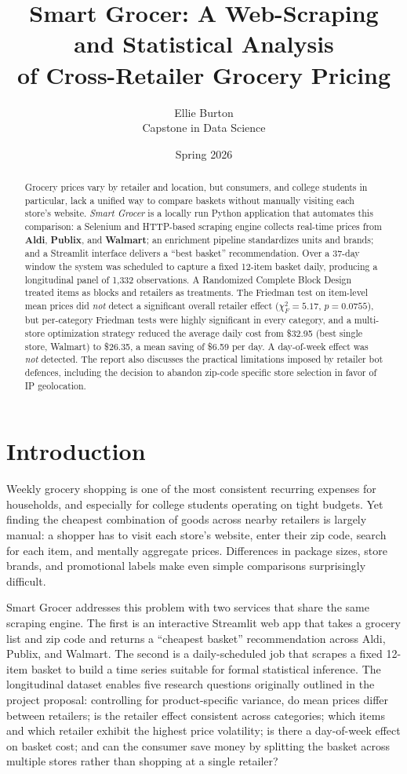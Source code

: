 \documentclass[11pt]{article}
\title{\textbf{Smart Grocer:} A Web-Scraping and Statistical Analysis\\
of Cross-Retailer Grocery Pricing}
\author{Ellie Burton \\ Capstone in Data Science}
\date{Spring 2026}
\begin{document}
\maketitle

\begin{abstract}
\noindent
Grocery prices vary by retailer and location, but consumers, and college
students in particular, lack a unified way to compare baskets without
manually visiting each store's website. \textit{Smart Grocer} is a
locally run Python application that automates this comparison: a
Selenium and HTTP-based scraping engine collects real-time prices from
\textbf{Aldi}, \textbf{Publix}, and \textbf{Walmart}; an enrichment
pipeline standardizes units and brands; and a Streamlit interface
delivers a ``best basket'' recommendation. Over a 37-day window the
system was scheduled to capture a fixed 12-item basket daily, producing
a longitudinal panel of 1{,}332 observations. A Randomized Complete
Block Design treated items as blocks and retailers as treatments. The
Friedman test on item-level mean prices did \textit{not} detect a
significant overall retailer effect ($\chi^2_F = 5.17$, $p = 0.0755$),
but per-category Friedman tests were highly significant in every
category, and a multi-store optimization strategy reduced the average
daily cost from \$32.95 (best single store, Walmart) to \$26.35, a mean
saving of \$6.59 per day. A day-of-week effect was \textit{not}
detected. The report also discusses the practical limitations imposed
by retailer bot defences, including the decision to abandon zip-code
specific store selection in favor of IP geolocation.
\end{abstract}

\section{Introduction}

Weekly grocery shopping is one of the most consistent recurring
expenses for households, and especially for college students operating
on tight budgets. Yet finding the cheapest combination of goods across
nearby retailers is largely manual: a shopper has to visit each store's
website, enter their zip code, search for each item, and mentally
aggregate prices. Differences in package sizes, store brands, and
promotional labels make even simple comparisons surprisingly difficult.

Smart Grocer addresses this problem with two services that share the
same scraping engine. The first is an interactive Streamlit web app
that takes a grocery list and zip code and returns a ``cheapest
basket'' recommendation across Aldi, Publix, and Walmart. The second is
a daily-scheduled job that scrapes a fixed 12-item basket to build a
time series suitable for formal statistical inference. The longitudinal
dataset enables five research questions originally outlined in the
project proposal: controlling for product-specific variance, do mean
prices differ between retailers; is the retailer effect consistent
across categories; which items and which retailer exhibit the highest
price volatility; is there a day-of-week effect on basket cost; and
can the consumer save money by splitting the basket across multiple
stores rather than shopping at a single retailer?
\end{document}
